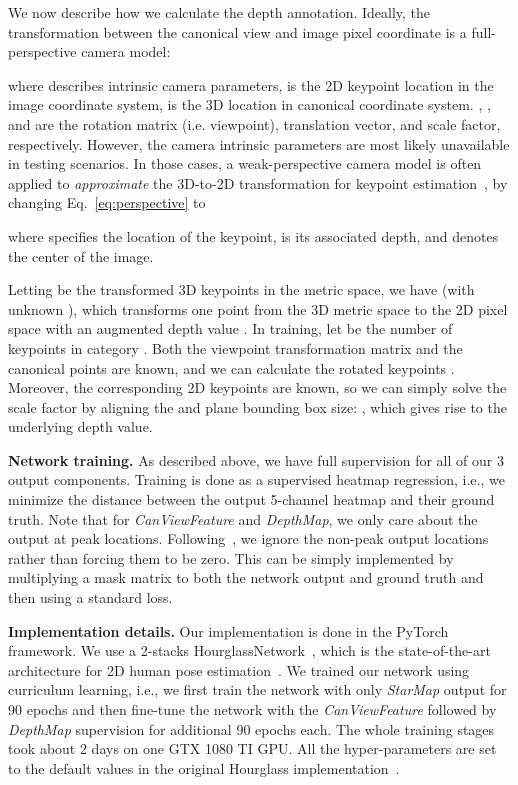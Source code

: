 \documentclass[runningheads]{llncs}
\begin{document}
We now describe how we calculate the depth annotation.
Ideally, the transformation between the canonical view and image pixel coordinate is a full-perspective camera model:

where  describes intrinsic camera parameters,  is the 2D keypoint location in the image coordinate system,  is the 3D location in canonical coordinate system. , , and  are the rotation matrix (i.e. viewpoint), translation vector, and scale factor, respectively. 
However, the camera intrinsic parameters are most likely unavailable in testing scenarios.
In those cases, a weak-perspective camera model is often applied to \emph{approximate} the 3D-to-2D transformation for keypoint estimation~\cite{Zhou_2017_ICCV,pavlakos20176}, by changing Eq.~\ref{eq:perspective} to

where  specifies the location of the keypoint,  is its associated depth, and  denotes the center of the image.

Letting  be the transformed 3D keypoints in the metric space, we have  (with unknown ), which transforms one point from the 3D metric space to the 2D pixel space with an augmented depth value .
In training, let  be the number of keypoints in category . Both the viewpoint transformation matrix  and the canonical points  are known, and we can calculate the rotated keypoints . 
Moreover, the corresponding 2D keypoints  are known, so we can simply solve the scale factor  by aligning the  and  plane bounding box size:
, which gives rise to the underlying depth value.

\noindent\textbf{Network training.} 
As described above, we have full supervision for all of our 3 output components. 
Training is done as a supervised heatmap regression, i.e., we minimize the  distance between the output 5-channel heatmap and their ground truth. 
Note that for \emph{CanViewFeature} and \emph{DepthMap}, we only care about the output at peak locations.
Following~\cite{newell2017pixels,newell2017associative}, 
we ignore the non-peak output locations rather than forcing them to be zero.
This can be simply implemented by multiplying a mask matrix to both the network output and ground truth and then using a standard  loss. 

\noindent\textbf{Implementation details.}
Our implementation is done in the PyTorch framework. 
We use a 2-stacks HourglassNetwork~\cite{newell2016stacked}, which is the state-of-the-art architecture for 2D human pose estimation~\cite{andriluka14cvpr}. 
We trained our network using curriculum learning, i.e., we first train the network with only \emph{StarMap} output for 90 epochs and then fine-tune the network with the \emph{CanViewFeature} followed by \emph{DepthMap} supervision for additional 90 epochs each. 
The whole training stages took about 2 days on one GTX 1080 TI GPU. 
All the hyper-parameters are set to the default values in the original Hourglass implementation~\cite{newell2016stacked}. 
\end{document}
